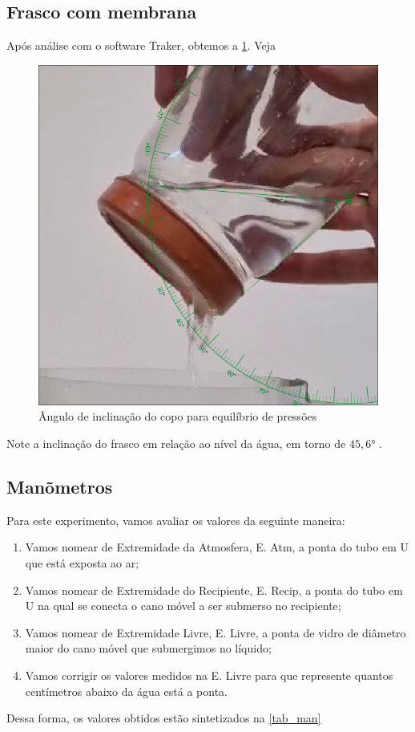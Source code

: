 \subsection{Frasco com membrana}

    Após análise com o software Traker, obtemos a \cref{copo.png}. Veja
    \begin{figure}[H]
        \centering
        \includegraphics[width=.5\linewidth]{fig/copo.png}
        \caption{Ângulo de inclinação do copo para equilíbrio de pressões}
        \label{copo.png}
    \end{figure}

    Note a inclinação do frasco em relação ao nível da água, em torno de \( 45,6 \)° .

\subsection{Manõmetros}

Para este experimento, vamos avaliar os valores da seguinte maneira:
\begin{enumerate}
    \item Vamos nomear de Extremidade da Atmosfera, E. Atm, a ponta do tubo em U que está exposta ao ar;
    \item Vamos nomear de Extremidade do Recipiente, E. Recip, a ponta do tubo em U na qual se conecta o cano móvel a ser submerso no recipiente;
    \item Vamos nomear de Extremidade Livre, E. Livre, a ponta de vidro de diâmetro maior do cano móvel que submergimos no líquido;
    \item Vamos corrigir os valores medidos na E. Livre para que represente quantos centímetros abaixo da água está a ponta.
\end{enumerate}

Dessa forma, os valores obtidos estão sintetizados na \cref{tab_man}

